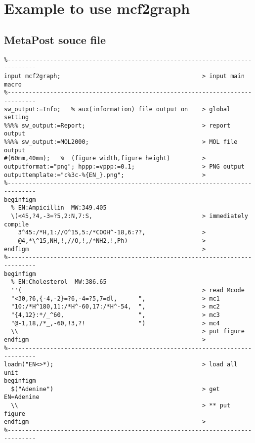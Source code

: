 \documentclass[a4paper]{article}
\begin{document}
\section{Example to use mcf2graph}
\subsection{MetaPost souce file}
%
%
\index{\textbackslash()}%
%
%
%
%
\begin{verbatim}
%------------------------------------------------------------------------------
input mcf2graph;                                        > input main macro
%------------------------------------------------------------------------------
sw_output:=Info;   % aux(information) file output on    > global setting
%%%% sw_output:=Report;                                 > report output
%%%% sw_output:=MOL2000;                                > MOL file output
#(60mm,40mm);   %  (figure width,figure height)         >
outputformat:="png"; hppp:=vppp:=0.1;                   > PNG output
outputtemplate:="c%3c-%{EN_}.png";                      >
%------------------------------------------------------------------------------
beginfigm
  % EN:Ampicillin  MW:349.405
  \(<45,?4,-3=?5,2:N,7:S,                               > immediately compile
    3^45:/*H,1://O^15,5:/*COOH^-18,6:??,                >
    @4,*\^15,NH,!,//O,!,/*NH2,!,Ph)                     >
endfigm                                                 >
%------------------------------------------------------------------------------
beginfigm
  % EN:Cholesterol  MW:386.65
  ''(                                                   > read Mcode
  "<30,?6,{-4,-2}=?6,-4=?5,7=dl,      ",                > mc1
  "10:/*H^180,11:/*H^-60,17:/*H^-54,  ",                > mc2
  "{4,12}:*/_^60,                     ",                > mc3
  "@-1,18,/*_,-60,!3,?!               ")                > mc4
  \\                                                    > put figure
endfigm                                                 >
%------------------------------------------------------------------------------
loadm("EN<>*);                                          > load all unit
beginfigm
  $("Adenine")                                          > get EN=Adenine
  \\                                                    > ** put figure
endfigm                                                 >
%------------------------------------------------------------------------------

\end{verbatim}
\end{document}
